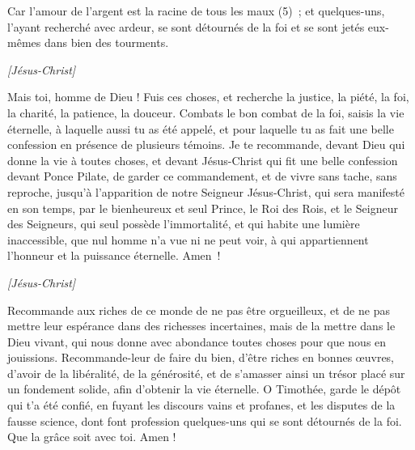 \begin{multicols}{2}
Car l’amour de l’argent est la racine de tous les maux (5) ; et quelques-uns, l’ayant recherché avec ardeur, se sont détournés de la foi et se sont jetés eux-mêmes dans bien des tourments.
\begin{center}
\textit{[Jésus-Christ]}
\end{center}
\PPE{}
Mais toi, homme de Dieu ! Fuis ces choses, et recherche la justice, la piété, la foi, la charité, la patience, la douceur.
Combats le bon combat de la foi, saisis la vie éternelle, à laquelle aussi tu as été appelé, et pour laquelle tu as fait une belle confession en présence de plusieurs témoins.
Je te recommande, devant Dieu qui donne la vie à toutes choses, et devant Jésus-Christ qui fit une belle confession devant Ponce Pilate,
de garder ce commandement, et de vivre sans tache, sans reproche, jusqu’à l'apparition de notre Seigneur Jésus-Christ,
qui sera manifesté en son temps, par le bienheureux et seul Prince, le Roi des Rois, et le Seigneur des Seigneurs,
qui seul possède l'immortalité, et qui habite une lumière inaccessible, que nul homme n'a vue ni ne peut voir, à qui appartiennent l'honneur et la puissance éternelle. Amen !
\begin{center}
\textit{[Jésus-Christ]}
\end{center}
\PPE{}
Recommande aux riches de ce monde de ne pas être orgueilleux, et de ne pas mettre leur espérance dans des richesses incertaines, mais de la mettre dans le Dieu vivant, qui nous donne avec abondance toutes choses pour que nous en jouissions.
Recommande-leur de faire du bien, d’être riches en bonnes œuvres, d’avoir de la libéralité, de la générosité,
et de s’amasser ainsi un trésor placé sur un fondement solide, afin d’obtenir la vie éternelle.
O Timothée, garde le dépôt qui t’a été confié, en fuyant les discours vains et profanes, et les disputes de la fausse science,
dont font profession quelques-uns qui se sont détournés de la foi. Que la grâce soit avec toi. Amen !
\PPE{}
\end{multicols}
